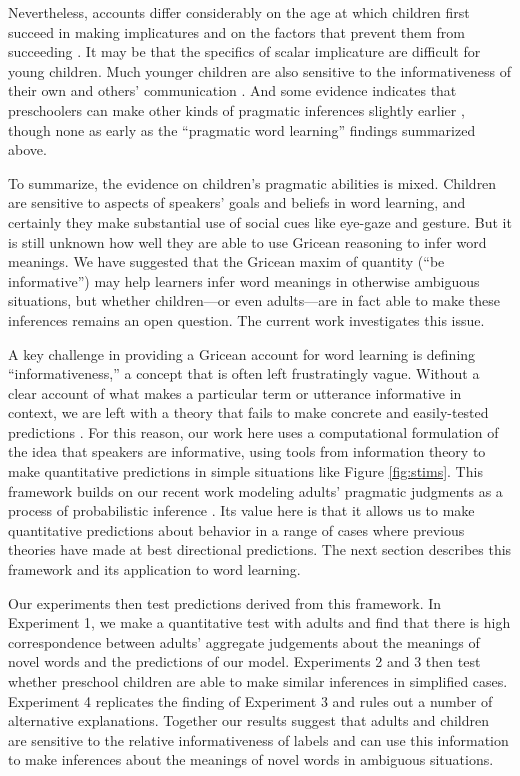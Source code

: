 \documentclass[review]{elsarticle}
\begin{document}
Nevertheless, accounts differ considerably on the age at which children first succeed in making implicatures \citep{papafragou2003,guasti2005} and on the factors that prevent them from succeeding \citep{barner2010,barner2011,katsos2011}. It may be that the specifics of scalar implicature are difficult for young children. Much younger children are also sensitive to the informativeness of their own and others' communication \citep{oneill2001,liszkowski2008,matthews2007,matthews2012}. And some evidence indicates that preschoolers can make other kinds of pragmatic inferences slightly earlier \citep{kurumada2013,stiller2014}, though none as early as the ``pragmatic word learning'' findings summarized above. 

To summarize, the evidence on children's pragmatic abilities is mixed. Children are sensitive to aspects of speakers' goals and beliefs in word learning, and certainly they make substantial use of social cues like eye-gaze and gesture. But it is still unknown how well they are able to use Gricean reasoning to infer word meanings. We have suggested that the Gricean maxim of quantity (``be informative'') may help learners infer word meanings in otherwise ambiguous situations, but whether children---or even adults---are in fact able to make these inferences remains an open question. The current work investigates this issue. 

A key challenge in providing a Gricean account for word learning is defining ``informativeness,'' a concept that is often left frustratingly vague. Without a clear account of what makes a particular term or utterance informative in context, we are left with a theory that fails to make concrete and easily-tested predictions \citep{pea1979}. For this reason, our work here uses a computational formulation of the idea that speakers are informative, using tools from information theory to make quantitative predictions in simple situations like Figure \ref{fig:stims}. This framework builds on our recent work modeling adults' pragmatic judgments as a process of probabilistic inference \citep{frank2012}. Its value here is that it allows us to make quantitative predictions about behavior in a range of cases where previous theories have made at best directional predictions. The next section describes this framework and its application to word learning.

Our experiments then test predictions derived from this framework. In Experiment 1, we make a quantitative test with adults and find that there is high correspondence between adults' aggregate judgements about the meanings of novel words and the predictions of our model. Experiments 2 and 3 then test whether preschool children are able to make similar inferences in simplified cases. Experiment 4 replicates the finding of Experiment 3 and rules out a number of alternative explanations. Together our results suggest that adults and children are sensitive to the relative informativeness of labels and can use this information to make inferences about the meanings of novel words in ambiguous situations.  
\end{document}
